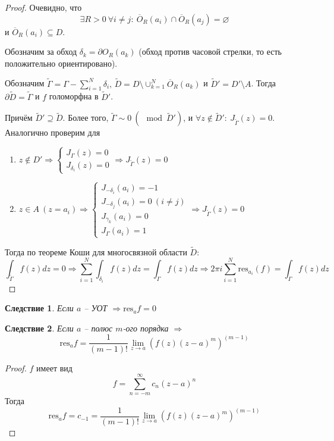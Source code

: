 \documentclass[a4paper,12pt]{article}
\renewcommand{\emptyset}{\ensuremath{\varnothing}}
\theoremstyle{plain}
\newtheorem*{corollary}{Следствие}
\theoremstyle{definition}
\theoremstyle{remark}
\begin{document}
\begin{proof}
	Очевидно, что
	\[
		\exists R > 0 \: \forall i \neq j :\: \overline{O}_R(a_i) \cap \overline{O}_R(a_j) = \emptyset
	\]
	и $\overline{O}_R(a_i) \subseteq D$.

	Обозначим за обход $\delta_k = \partial O_R(a_k)$ (обход против часовой стрелки, то есть положительно ориентировано).

	Обозначим $\tilde{\Gamma} = \Gamma - \sum_{i = 1}^N \delta_i,\, \tilde{D} = D \setminus \cup_{k = 1}^N \overline{O}_R(a_k)$ и $\tilde{D}' = D'
		\setminus A$. Тогда $\partial\tilde{D} = \tilde{\Gamma}$ и $f$ голоморфна в $\tilde{D}'$. 

		Причём $\tilde{D}' \supseteq \tilde{D}$. Более того, $\tilde{\Gamma} \sim 0 \: (\mod \tilde{D}')$, и $\forall z \not\in \tilde{D}' :\: J_{\tilde{\Gamma}}(z) = 0$. Аналогично проверим для
		\begin{enumerate}
			\item $z \not\in D' \Rightarrow \begin{cases}
				J_\Gamma(z) = 0\\
				J_{\delta_i}(z) = 0
			\end{cases} \Rightarrow J_{\tilde{\Gamma}}(z) = 0$
			\item $z \in A \: (z = a_i) \Rightarrow \begin{cases}
				J_{-\delta_i}(a_i) = -1\\
				J_{-\delta_j}(a_i) = 0 \: (i \neq j)\\
				J_{\gamma_k}(a_i) = 0\\
				J_\Gamma(a_i) = 1
			\end{cases} \Rightarrow J_{\tilde{\Gamma}}(z) = 0$
		\end{enumerate}
		Тогда по теореме Коши для многосвязной области $\tilde{D}$:
		\[
			\int_{\tilde{\Gamma}} f(z)dz = 0 \Rightarrow \sum_{i = 1}^N\int_{\delta_i}f(z)dz = \int_\Gamma f(z)dz \Rightarrow 2\pi i\sum_{i = 1}^N\text{res}_{a_i}(f) = \int_\Gamma f(z)dz
		\]
\end{proof}

\begin{corollary}
	Если $a$ -- УОТ $\Rightarrow \text{res}_af = 0$
\end{corollary}

\begin{corollary}
	Если $a$ -- полюс $m$-ого порядка $\Rightarrow$
	\[
		\text{res}_af = \frac{1}{(m - 1)!}\lim_{z \to a}\left(f(z)(z - a)^m\right)^{(m - 1)}
	\]
\end{corollary}

\begin{proof}
	$f$ имеет вид
	\[
		f = \sum_{n = -m}^\infty c_{n}(z - a)^n
	\]
	Тогда
	\[
		\text{res}_af = c_{-1} = \frac{1}{(m - 1)!}\lim_{z \to a}\left(f(z)(z - a)^m\right)^{(m - 1)}
	\]
\end{proof}
\end{document}
